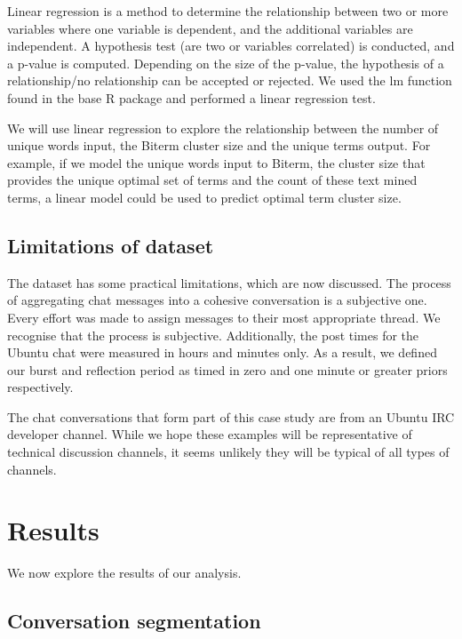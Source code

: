 Linear regression is a method to determine the relationship between two or more variables where one variable is dependent, and the additional variables are independent. A hypothesis test (are two or variables correlated) is conducted, and a p-value is computed. Depending on the size of the p-value, the hypothesis of a relationship/no relationship can be accepted or rejected. We used the lm function found in the base R package \cite{lmR} and performed a linear regression test.

We will use linear regression to explore the relationship between the number of unique words input, the Biterm cluster size and the unique terms output. For example, if we model the unique words input to Biterm, the cluster size that provides the unique optimal set of terms and the count of these text mined terms, a linear model could be used to predict optimal term cluster size.

\subsection{Limitations of dataset}

The dataset has some practical limitations, which are now discussed. The process of aggregating chat messages into a cohesive conversation is a subjective one. Every effort was made to assign messages to their most appropriate thread. We recognise that the process is subjective. Additionally, the post times for the Ubuntu chat were measured in hours and minutes only. As a result, we defined our burst and reflection period as timed in zero and one minute or greater priors respectively. 

The chat conversations that form part of this case study are from an Ubuntu IRC developer channel. While we hope these examples will be representative of technical discussion channels, it seems unlikely they will be typical of all types of channels.

\section{Results}

We now explore the results of our analysis.

\subsection{Conversation segmentation}

